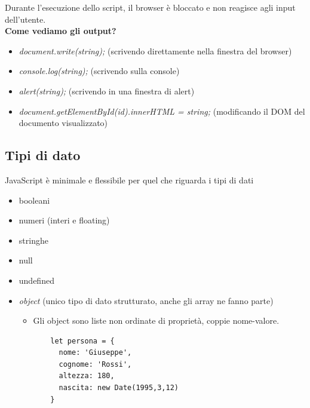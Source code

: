 \documentclass[a4paper,12pt]{article}
\begin{document}
Durante l’esecuzione dello script, il browser è bloccato e non reagisce agli input dell’utente.  \\
\vspace{1em}
\textbf{Come vediamo gli output?}
\begin{itemize}
  \item \textit{document.write(string);} (scrivendo direttamente nella finestra del browser)
  \item \textit{console.log(string);} (scrivendo sulla console)
  \item \textit{alert(string);} (scrivendo in una finestra di alert)
  \item \textit{document.getElementById(id).innerHTML = string;} (modificando il DOM del documento visualizzato)
\end{itemize}
\vspace{1em}   
\subsection{Tipi di dato}
JavaScript è minimale e flessibile per quel che riguarda i tipi di dati
\begin{itemize}
  \item booleani
  \item numeri (interi e floating)
  \item stringhe
  \item null
  \item undefined
  \item \textit{object} (unico tipo di dato strutturato, anche gli array ne fanno parte)
  \begin{itemize}
    \item Gli object sono liste non ordinate di proprietà, coppie nome-valore.
    \begin{lstlisting}
    let persona = {
      nome: 'Giuseppe',
      cognome: 'Rossi',
      altezza: 180,
      nascita: new Date(1995,3,12)
    }
\end{lstlisting}
  \end{itemize}
\end{itemize}
\end{document}
